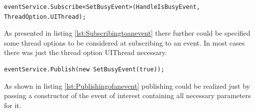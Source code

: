 \begin{lstlisting}[language={[Sharp]C},caption={Subscribing to an event},captionpos=b,label=lst:Subscribingtoanevent]
eventService.Subscribe<SetBusyEvent>(HandleIsBusyEvent, ThreadOption.UIThread);
\end{lstlisting}

As presented in listing \ref{lst:Subscribingtoanevent} there further could be specified some thread options to be considered at subscribing to an event. In most cases there was just the thread option UIThread necessary.

\begin{lstlisting}[language={[Sharp]C},caption={Publishing of an event},captionpos=b,label=lst:Publishingofanevent]
eventService.Publish(new SetBusyEvent(true));
\end{lstlisting}

As shown in listing \ref{lst:Publishingofanevent} publishing could be realized just by passing a constructor of the event of interest containing all necessary parameters for it.

